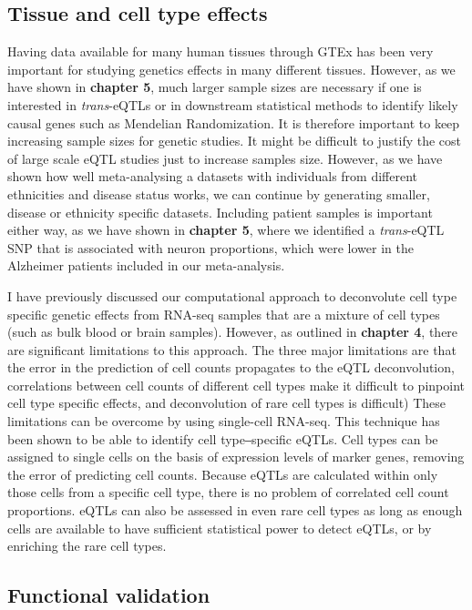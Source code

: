 \subsection{Tissue and cell type effects}
Having data available for many human tissues through GTEx\cite{gtex} has been very important for studying genetics effects in many different tissues. However, as we have shown in \textbf{chapter 5}, much larger sample sizes are necessary if one is interested in \emph{trans}-eQTLs or in downstream statistical methods to identify likely causal genes such as Mendelian Randomization. It is therefore important to keep increasing sample sizes for genetic studies. It might be difficult to justify the cost of large scale eQTL studies just to increase samples size. However, as we have shown how well meta-analysing a datasets with individuals from different ethnicities and disease status works, we can continue by generating smaller, disease or ethnicity specific datasets. Including patient samples is important either way, as we have shown in \textbf{chapter 5}, where we identified a \emph{trans}-eQTL SNP that is associated with neuron proportions, which were lower in the Alzheimer patients included in our meta-analysis. 

I have previously discussed our computational approach to deconvolute cell type specific genetic effects from RNA-seq samples that are a mixture of cell types (such as bulk blood or brain samples). However, as outlined in \textbf{chapter 4}, there are significant limitations to this approach. The three major limitations are that the error in the prediction of cell counts propagates to the eQTL deconvolution, correlations between cell counts of different cell types make it difficult to pinpoint cell type specific effects, and deconvolution of rare cell types is difficult) These limitations can be overcome by using single-cell RNA-seq\cite{tangMRNASeqWholetranscriptomeAnalysis2009}. This technique has been shown to be able to identify cell type‒specific eQTLs\cite{wijstSinglecellRNASequencing2018}. Cell types can be assigned to single cells on the basis of expression levels of marker genes, removing the error of predicting cell counts. Because eQTLs are calculated within only those cells from a specific cell type, there is no problem of correlated cell count proportions. eQTLs can also be assessed in even rare cell types as long as enough cells are available to have sufficient statistical power to detect eQTLs, or by enriching the rare cell types.


\subsection{Functional validation}

